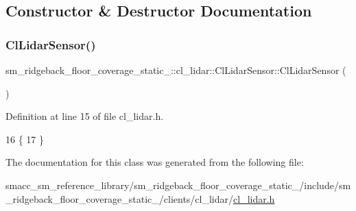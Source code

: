 \subsection{Constructor \& Destructor Documentation}
\mbox{\label{classsm__ridgeback__floor__coverage__static__1_1_1cl__lidar_1_1ClLidarSensor_a59237b94ce39ca8478f818db90836c64}} 
\subsubsection{\texorpdfstring{Cl\+Lidar\+Sensor()}{ClLidarSensor()}}
{\footnotesize\ttfamily sm\+\_\+ridgeback\+\_\+floor\+\_\+coverage\+\_\+static\+\_\+::cl\+\_\+lidar\+::\+Cl\+Lidar\+Sensor\+::\+Cl\+Lidar\+Sensor (\begin{DoxyParamCaption}{ }\end{DoxyParamCaption})\hspace{0.3cm}{\ttfamily [inline]}}



Definition at line 15 of file cl\+\_\+lidar.\+h.


\begin{DoxyCode}
16     \{
17     \}
\end{DoxyCode}


The documentation for this class was generated from the following file\+:\begin{DoxyCompactItemize}
\item 
smacc\+\_\+sm\+\_\+reference\+\_\+library/sm\+\_\+ridgeback\+\_\+floor\+\_\+coverage\+\_\+static\+\_/include/sm\+\_\+ridgeback\+\_\+floor\+\_\+coverage\+\_\+static\+\_/clients/cl\+\_\+lidar/\hyperlink{sm__ridgeback__floor__coverage__static__1_2include_2sm__ridgeback__floor__coverage__static__1_2clients_2cl__lidar_2cl__lidar_8h}{cl\+\_\+lidar.\+h}\end{DoxyCompactItemize}
